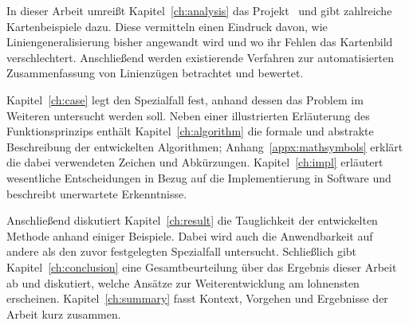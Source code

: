 \documentclass[../main/thesis.tex]{subfiles}
\begin{document}
In dieser Arbeit umreißt Kapitel~\ref{ch:analysis} das Projekt \osm\ und gibt zahlreiche Kartenbeispiele dazu.
Diese vermitteln einen Eindruck davon, wie Liniengeneralisierung bisher angewandt wird und wo ihr Fehlen das Kartenbild verschlechtert.
Anschließend werden existierende Verfahren zur automatisierten Zusammenfassung von Linienzügen betrachtet und bewertet.

Kapitel~\ref{ch:case} legt den Spezialfall fest, anhand dessen das Problem im Weiteren untersucht werden soll.
Neben einer illustrierten Erläuterung des Funktionsprinzips enthält Kapitel~\ref{ch:algorithm} die formale und abstrakte Beschreibung der entwickelten Algorithmen;
Anhang~\ref{appx:mathsymbols} erklärt die dabei verwendeten Zeichen und Abkürzungen.
Kapitel~\ref{ch:impl} erläutert wesentliche Entscheidungen in Bezug auf die Implementierung in Software und beschreibt unerwartete Erkenntnisse.

Anschließend diskutiert Kapitel~\ref{ch:result} die Tauglichkeit der entwickelten Methode anhand einiger Beispiele.
Dabei wird auch die Anwendbarkeit auf andere als den zuvor festgelegten Spezialfall untersucht.
Schließlich gibt Kapitel~\ref{ch:conclusion} eine Gesamtbeurteilung über das Ergebnis dieser Arbeit ab und diskutiert, welche Ansätze zur Weiterentwicklung am lohnensten erscheinen.
Kapitel~\ref{ch:summary} fasst Kontext, Vorgehen und Ergebnisse der Arbeit kurz zusammen.
\end{document}
